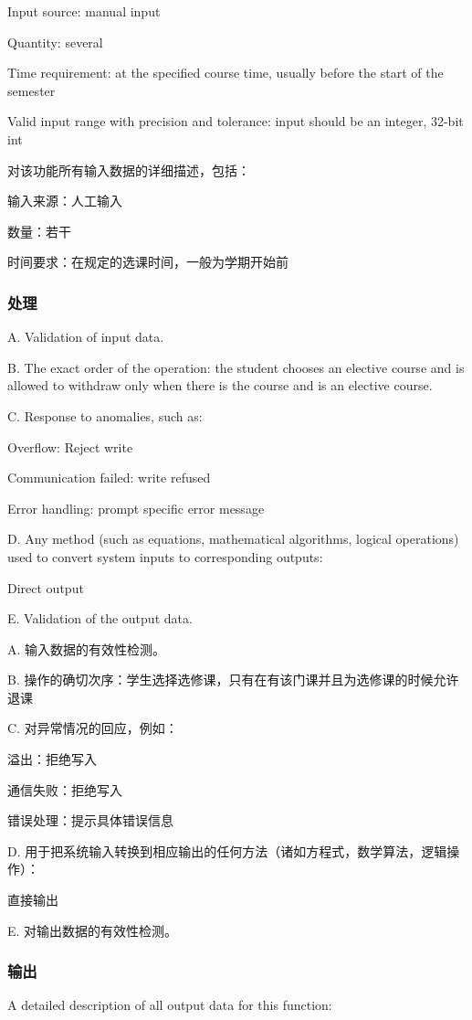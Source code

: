 Input source: manual input

Quantity: several

Time requirement: at the specified course time, usually before the start of the semester

Valid input range with precision and tolerance: input should be an integer, 32-bit int

对该功能所有输入数据的详细描述，包括：

		输入来源：人工输入

		数量：若干

		时间要求：在规定的选课时间，一般为学期开始前

		
\subsubsection{处理}
A. Validation of input data.

B. The exact order of the operation: the student chooses an elective course and is allowed to withdraw only when there is the course and is an elective course.

C. Response to anomalies, such as:

Overflow: Reject write

Communication failed: write refused

Error handling: prompt specific error message

D. Any method (such as equations, mathematical algorithms, logical operations) used to convert system inputs to corresponding outputs:

Direct output

E. Validation of the output data.

A. 输入数据的有效性检测。

B. 操作的确切次序：学生选择选修课，只有在有该门课并且为选修课的时候允许退课

C. 对异常情况的回应，例如：

	溢出：拒绝写入

	通信失败：拒绝写入

	错误处理：提示具体错误信息

D. 用于把系统输入转换到相应输出的任何方法（诸如方程式，数学算法，逻辑操作）：

	直接输出
		
E.	对输出数据的有效性检测。
\subsubsection{输出}
A detailed description of all output data for this function:

